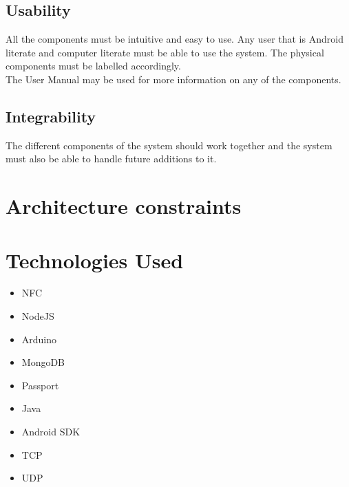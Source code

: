 \documentclass[a4paper,12pt,titlepage]{article}
\begin{document}
\subsection{Usability}
All the components must be intuitive and easy to use. Any user that is Android literate and computer literate must be able to use the system. The physical components must be labelled accordingly. 
\\ The User Manual may be used for more information on any of the components. 

\subsection{Integrability}
The different components of the system should work together and the system must also be able to handle future additions to it.\\

\newpage	\section{Architecture constraints}
\newpage	\section{Technologies Used}
\begin{itemize}
\item NFC
\item NodeJS
\item Arduino
\item MongoDB
\item Passport
\item Java
\item Android SDK
\item TCP
\item UDP
\end{itemize}
\end{document}
